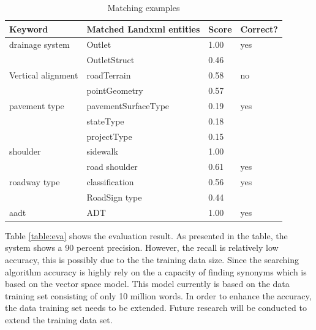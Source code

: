 \documentclass[Journal, InsideFigs, DoubleSpace]{ascelike} %
\begin{document}
\begin{table} [t] 
\caption{Matching examples}
\label{table:examples}
\centering
\small
\renewcommand{\arraystretch}{1.25}
\begin{tabular}{l l l l}
\hline
\hline
\textbf{Keyword} & \textbf{Matched Landxml entities} & \textbf{Score} & \textbf{Correct?}\\
\hline
drainage system & Outlet & 1.00 & yes\\
 & OutletStruct & 0.46\\
Vertical alignment & roadTerrain & 0.58 & no\\
 & pointGeometry & 0.57\\
pavement type & pavementSurfaceType & 0.19 & yes\\
 & stateType & 0.18\\
 & projectType & 0.15\\
shoulder & sidewalk & 1.00\\
 & road shoulder & 0.61 & yes\\
roadway type & classification & 0.56 & yes\\
 & RoadSign type & 0.44\\
aadt & ADT & 1.00 & yes\\
\hline
\hline
\end{tabular}
\normalsize
\end{table}
%
Table \ref{table:eva} shows the evaluation result. As presented in the table, the system shows a 90 percent precision. However, the recall is relatively low accuracy, this is possibly due to the the training data size. Since the searching algorithm accuracy is highly rely on the a capacity of finding synonyms which is based on the vector space model. This model currently is based on the data training set consisting of only 10 million words. In order to enhance the accuracy, the data training set needs to be extended. Future research will be conducted to extend the training data set. 
%
\end{document}
